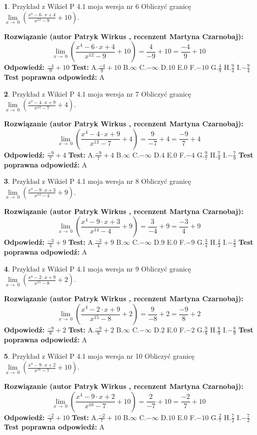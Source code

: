 \documentclass[12pt, a4paper]{article}
\theoremstyle{definition} %
\newtheorem{zad}{}
\newcommand{\zadStart}[1]{\begin{zad}#1\newline}
\newcommand{\zadStop}{\end{zad}}
\newcommand{\rozwStart}[2]{\noindent \textbf{Rozwiązanie (autor #1 , recenzent #2): }\newline}
\newcommand{\rozwStop}{\newline}
\newcommand{\odpStart}{\noindent \textbf{Odpowiedź:}\newline}
\newcommand{\odpStop}{\newline}
\newcommand{\testStart}{\noindent \textbf{Test:}\newline}
\newcommand{\testStop}{\newline}
\newcommand{\kluczStart}{\noindent \textbf{Test poprawna odpowiedź:}\newline}
\newcommand{\kluczStop}{\newline}
\begin{document}
\zadStart{Przykład z Wikieł P 4.1 moja wersja nr 6}
Obliczyć granicę $\lim\limits_{x\to\ 0}(\frac{x^{4}-6 \cdot x +4}{x^{12}-9}+10)$.
\zadStop
\rozwStart{Patryk Wirkus}{Martyna Czarnobaj}
$$\lim\limits_{x\to\ 0}(\frac{x^{4}-6 \cdot x +4}{x^{12}-9}+10)=\frac{4}{-9}+10=\frac{-4}{9}+10$$
\rozwStop
\odpStart
$\frac{-4}{9}+10$
\odpStop
\testStart
A.$\frac{-4}{9}+10$
B.$\infty$
C.$-\infty$
D.$10$
E.$0$
F.$-10$
G.$\frac{4}{9}$
H.$\frac{9}{4}$
I.$-\frac{9}{4}$
\testStop
\kluczStart
A
\kluczStop



\zadStart{Przykład z Wikieł P 4.1 moja wersja nr 7}
Obliczyć granicę $\lim\limits_{x\to\ 0}(\frac{x^{4}-4 \cdot x +9}{x^{13}-7}+4)$.
\zadStop
\rozwStart{Patryk Wirkus}{Martyna Czarnobaj}
$$\lim\limits_{x\to\ 0}(\frac{x^{4}-4 \cdot x +9}{x^{13}-7}+4)=\frac{9}{-7}+4=\frac{-9}{7}+4$$
\rozwStop
\odpStart
$\frac{-9}{7}+4$
\odpStop
\testStart
A.$\frac{-9}{7}+4$
B.$\infty$
C.$-\infty$
D.$4$
E.$0$
F.$-4$
G.$\frac{9}{7}$
H.$\frac{7}{9}$
I.$-\frac{7}{9}$
\testStop
\kluczStart
A
\kluczStop



\zadStart{Przykład z Wikieł P 4.1 moja wersja nr 8}
Obliczyć granicę $\lim\limits_{x\to\ 0}(\frac{x^{4}-9 \cdot x +3}{x^{14}-4}+9)$.
\zadStop
\rozwStart{Patryk Wirkus}{Martyna Czarnobaj}
$$\lim\limits_{x\to\ 0}(\frac{x^{4}-9 \cdot x +3}{x^{14}-4}+9)=\frac{3}{-4}+9=\frac{-3}{4}+9$$
\rozwStop
\odpStart
$\frac{-3}{4}+9$
\odpStop
\testStart
A.$\frac{-3}{4}+9$
B.$\infty$
C.$-\infty$
D.$9$
E.$0$
F.$-9$
G.$\frac{3}{4}$
H.$\frac{4}{3}$
I.$-\frac{4}{3}$
\testStop
\kluczStart
A
\kluczStop



\zadStart{Przykład z Wikieł P 4.1 moja wersja nr 9}
Obliczyć granicę $\lim\limits_{x\to\ 0}(\frac{x^{4}-2 \cdot x +9}{x^{15}-8}+2)$.
\zadStop
\rozwStart{Patryk Wirkus}{Martyna Czarnobaj}
$$\lim\limits_{x\to\ 0}(\frac{x^{4}-2 \cdot x +9}{x^{15}-8}+2)=\frac{9}{-8}+2=\frac{-9}{8}+2$$
\rozwStop
\odpStart
$\frac{-9}{8}+2$
\odpStop
\testStart
A.$\frac{-9}{8}+2$
B.$\infty$
C.$-\infty$
D.$2$
E.$0$
F.$-2$
G.$\frac{9}{8}$
H.$\frac{8}{9}$
I.$-\frac{8}{9}$
\testStop
\kluczStart
A
\kluczStop



\zadStart{Przykład z Wikieł P 4.1 moja wersja nr 10}
Obliczyć granicę $\lim\limits_{x\to\ 0}(\frac{x^{4}-9 \cdot x +2}{x^{16}-7}+10)$.
\zadStop
\rozwStart{Patryk Wirkus}{Martyna Czarnobaj}
$$\lim\limits_{x\to\ 0}(\frac{x^{4}-9 \cdot x +2}{x^{16}-7}+10)=\frac{2}{-7}+10=\frac{-2}{7}+10$$
\rozwStop
\odpStart
$\frac{-2}{7}+10$
\odpStop
\testStart
A.$\frac{-2}{7}+10$
B.$\infty$
C.$-\infty$
D.$10$
E.$0$
F.$-10$
G.$\frac{2}{7}$
H.$\frac{7}{2}$
I.$-\frac{7}{2}$
\testStop
\kluczStart
A
\kluczStop
\end{document}
